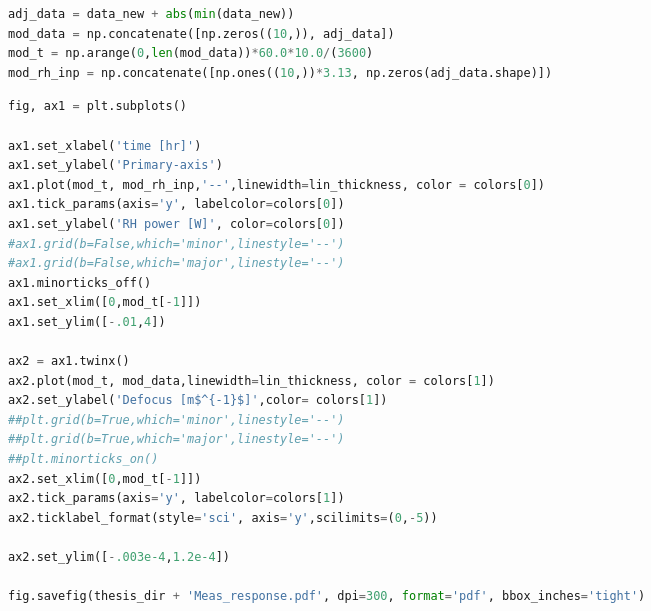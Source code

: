 %

\begin{spacing}{1.2} \begin{lstlisting}[frame=single,language=Python]
adj_data = data_new + abs(min(data_new))
mod_data = np.concatenate([np.zeros((10,)), adj_data])
mod_t = np.arange(0,len(mod_data))*60.0*10.0/(3600)
mod_rh_inp = np.concatenate([np.ones((10,))*3.13, np.zeros(adj_data.shape)])
\end{lstlisting} \end{spacing}

\begin{spacing}{1.2} \begin{lstlisting}[frame=single,language=Python]
fig, ax1 = plt.subplots() 

ax1.set_xlabel('time [hr]') 
ax1.set_ylabel('Primary-axis') 
ax1.plot(mod_t, mod_rh_inp,'--',linewidth=lin_thickness, color = colors[0]) 
ax1.tick_params(axis='y', labelcolor=colors[0])
ax1.set_ylabel('RH power [W]', color=colors[0])
#ax1.grid(b=False,which='minor',linestyle='--')
#ax1.grid(b=False,which='major',linestyle='--')
ax1.minorticks_off()
ax1.set_xlim([0,mod_t[-1]])
ax1.set_ylim([-.01,4])

ax2 = ax1.twinx() 
ax2.plot(mod_t, mod_data,linewidth=lin_thickness, color = colors[1])
ax2.set_ylabel('Defocus [m$^{-1}$]',color= colors[1])
##plt.grid(b=True,which='minor',linestyle='--')
##plt.grid(b=True,which='major',linestyle='--')
##plt.minorticks_on()
ax2.set_xlim([0,mod_t[-1]])
ax2.tick_params(axis='y', labelcolor=colors[1])
ax2.ticklabel_format(style='sci', axis='y',scilimits=(0,-5))

ax2.set_ylim([-.003e-4,1.2e-4])

fig.savefig(thesis_dir + 'Meas_response.pdf', dpi=300, format='pdf', bbox_inches='tight')
\end{lstlisting} \end{spacing}


